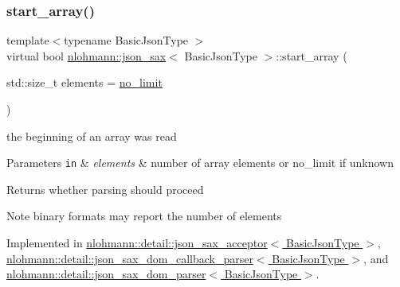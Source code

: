 \mbox{\label{structnlohmann_1_1json__sax_aa7717e96a46e41984260ebabab262369}} 
\subsubsection{\texorpdfstring{start\+\_\+array()}{start\_array()}}
{\footnotesize\ttfamily template$<$typename Basic\+Json\+Type $>$ \\
virtual bool \hyperlink{structnlohmann_1_1json__sax}{nlohmann\+::json\+\_\+sax}$<$ Basic\+Json\+Type $>$\+::start\+\_\+array (\begin{DoxyParamCaption}\item[{std\+::size\+\_\+t}]{elements = {\ttfamily \hyperlink{structnlohmann_1_1json__sax_a84031c6bbd5b85ec13da024fe9e2b9c9}{no\+\_\+limit}} }\end{DoxyParamCaption})\hspace{0.3cm}{\ttfamily [pure virtual]}}



the beginning of an array was read 


\begin{DoxyParams}[1]{Parameters}
\mbox{\tt in}  & {\em elements} & number of array elements or no\+\_\+limit if unknown \\
\hline
\end{DoxyParams}
\begin{DoxyReturn}{Returns}
whether parsing should proceed 
\end{DoxyReturn}
\begin{DoxyNote}{Note}
binary formats may report the number of elements 
\end{DoxyNote}


Implemented in \hyperlink{classnlohmann_1_1detail_1_1json__sax__acceptor_aa71d9a89f01f3aa31f573991def61f08}{nlohmann\+::detail\+::json\+\_\+sax\+\_\+acceptor$<$ Basic\+Json\+Type $>$}, \hyperlink{classnlohmann_1_1detail_1_1json__sax__dom__callback__parser_ad3ec763c78876bf84f3874ebb0a3df26}{nlohmann\+::detail\+::json\+\_\+sax\+\_\+dom\+\_\+callback\+\_\+parser$<$ Basic\+Json\+Type $>$}, and \hyperlink{classnlohmann_1_1detail_1_1json__sax__dom__parser_a888d06ee0dfe01a5e6acd92ad9e2804c}{nlohmann\+::detail\+::json\+\_\+sax\+\_\+dom\+\_\+parser$<$ Basic\+Json\+Type $>$}.

